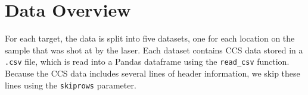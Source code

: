 \section{Data Overview}\label{subsec:data_overview}

For each target, the data is split into five datasets, one for each location on the sample that was shot at by the laser.
Each dataset contains CCS data stored in a \texttt{.csv} file, which is read into a Pandas dataframe\cite{pandas} using the \texttt{read\_csv} function.
Because the CCS data includes several lines of header information, we skip these lines using the \texttt{skiprows} parameter.